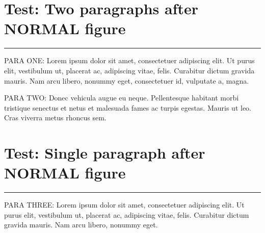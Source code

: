 \documentclass[11pt,a4paper]{article}
\begin{document}
\section{Test: Two paragraphs after NORMAL figure}
\begin{swarmwrap}%
  \begin{minipage}[t]{3cm}
    \centering
    \textcolor{red!30}{\rule{\linewidth}{3cm}}
  \end{minipage}%
\end{swarmwrap}%
\swarmwrapnext
PARA ONE: Lorem ipsum dolor sit amet, consectetuer adipiscing elit. Ut purus elit, vestibulum ut, placerat ac, adipiscing vitae, felis. Curabitur dictum gravida mauris. Nam arcu libero, nonummy eget, consectetuer id, vulputate a, magna.

PARA TWO: Donec vehicula augue eu neque. Pellentesque habitant morbi tristique senectus et netus et malesuada fames ac turpis egestas. Mauris ut leo. Cras viverra metus rhoncus sem.

\section{Test: Single paragraph after NORMAL figure}
\begin{swarmwrap}%
  \begin{minipage}[t]{4cm}
    \centering
    \textcolor{blue!30}{\rule{\linewidth}{4cm}}
  \end{minipage}%
\end{swarmwrap}%
\swarmwrapnext
PARA THREE: Lorem ipsum dolor sit amet, consectetuer adipiscing elit. Ut purus elit, vestibulum ut, placerat ac, adipiscing vitae, felis. Curabitur dictum gravida mauris. Nam arcu libero, nonummy eget.
\end{document}
